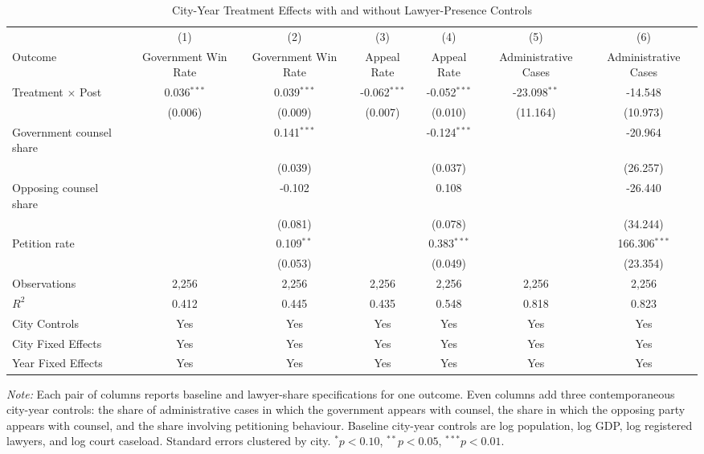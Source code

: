 \begin{table}[!htbp]
\setlength{\abovecaptionskip}{0pt}
\centering
\caption{City-Year Treatment Effects with and without Lawyer-Presence Controls}
\label{tab:city_year_lawyer_share_appendix}
\begin{threeparttable}
\begin{tabular}{lcccccc}
\toprule
 & (1) & (2) & (3) & (4) & (5) & (6) \\
Outcome & Government Win Rate & Government Win Rate & Appeal Rate & Appeal Rate & Administrative Cases & Administrative Cases \\
\midrule
Treatment $\times$ Post & 0.036$^{***}$ & 0.039$^{***}$ & -0.062$^{***}$ & -0.052$^{***}$ & -23.098$^{**}$ & -14.548 \\
& (0.006) & (0.009) & (0.007) & (0.010) & (11.164) & (10.973) \\
\addlinespace
Government counsel share &  & 0.141$^{***}$ &  & -0.124$^{***}$ &  & -20.964 \\
&  & (0.039) &  & (0.037) &  & (26.257) \\
Opposing counsel share &  & -0.102 &  & 0.108 &  & -26.440 \\
&  & (0.081) &  & (0.078) &  & (34.244) \\
Petition rate &  & 0.109$^{**}$ &  & 0.383$^{***}$ &  & 166.306$^{***}$ \\
&  & (0.053) &  & (0.049) &  & (23.354) \\
\addlinespace
Observations & 2,256 & 2,256 & 2,256 & 2,256 & 2,256 & 2,256 \\
$R^2$ & 0.412 & 0.445 & 0.435 & 0.548 & 0.818 & 0.823 \\
City Controls & Yes & Yes & Yes & Yes & Yes & Yes \\
City Fixed Effects & Yes & Yes & Yes & Yes & Yes & Yes \\
Year Fixed Effects & Yes & Yes & Yes & Yes & Yes & Yes \\
\bottomrule
\end{tabular}
\begin{tablenotes}[flushleft]
\footnotesize
\item \textit{Note:} Each pair of columns reports baseline and lawyer-share specifications for one outcome. Even columns add three contemporaneous city-year controls: the share of administrative cases in which the government appears with counsel, the share in which the opposing party appears with counsel, and the share involving petitioning behaviour. Baseline city-year controls are log population, log GDP, log registered lawyers, and log court caseload. Standard errors clustered by city. $^{*}p<0.10$, $^{**}p<0.05$, $^{***}p<0.01$.
\end{tablenotes}
\end{threeparttable}
\end{table}
